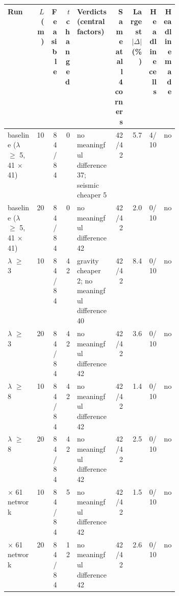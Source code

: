 \scriptsize
\begin{tabular}{>{\raggedright\arraybackslash}p{0.17\linewidth}rrr>{\raggedright\arraybackslash}p{0.22\linewidth}rrrr}
\toprule
Run & $L$ (m) & Feasible & \shortstack{$t$\\changed} & Verdicts (central factors) & \shortstack{Same at all\\4 corners} & \shortstack{Largest\\$|\Delta|$ (\%)} & \shortstack{Headline\\cells} & \shortstack{Headline\\made} \\
\midrule
baseline ($\lambda$ $\geq$ 5, 41 $\times$ 41) & 10 & 84/84 & 0 & no meaningful difference 37; seismic cheaper 5 & 42/42 & 5.7 & 4/10 & no \\
baseline ($\lambda$ $\geq$ 5, 41 $\times$ 41) & 20 & 84/84 & 0 & no meaningful difference 42 & 42/42 & 2.0 & 0/10 & no \\
$\lambda$ $\geq$ 3 & 10 & 84/84 & 42 & gravity cheaper 2; no meaningful difference 40 & 42/42 & 8.4 & 0/10 & no \\
$\lambda$ $\geq$ 3 & 20 & 84/84 & 42 & no meaningful difference 42 & 42/42 & 3.6 & 0/10 & no \\
$\lambda$ $\geq$ 8 & 10 & 84/84 & 42 & no meaningful difference 42 & 42/42 & 1.4 & 0/10 & no \\
$\lambda$ $\geq$ 8 & 20 & 84/84 & 42 & no meaningful difference 42 & 42/42 & 2.5 & 0/10 & no \\
61 $\times$ 61 network & 10 & 84/84 & 5 & no meaningful difference 42 & 42/42 & 1.5 & 0/10 & no \\
61 $\times$ 61 network & 20 & 84/84 & 12 & no meaningful difference 42 & 42/42 & 2.6 & 0/10 & no \\
\bottomrule
\end{tabular}
